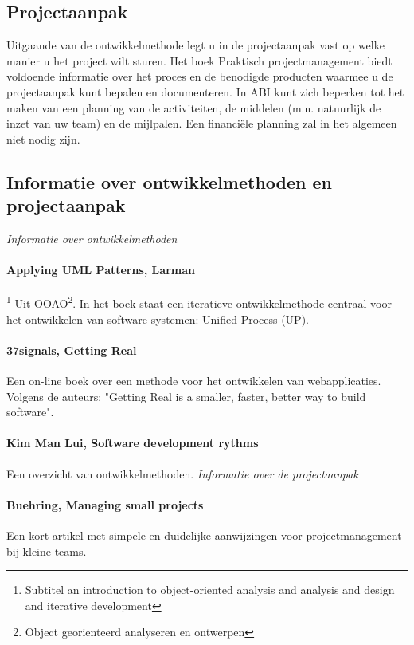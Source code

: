\subsection{Projectaanpak}
    Uitgaande van de ontwikkelmethode legt u in de projectaanpak vast op welke
manier u het project wilt sturen. Het boek Praktisch projectmanagement biedt
voldoende informatie over het proces en de benodigde producten waarmee u de
projectaanpak kunt bepalen en documenteren.
    In ABI kunt zich beperken tot het maken van een planning van de
activiteiten, de middelen (m.n. natuurlijk de inzet van uw team) en de
mijlpalen. Een financiële planning zal in het algemeen niet nodig zijn.

\subsection{Informatie over ontwikkelmethoden en projectaanpak}

\emph{Informatie over ontwikkelmethoden}

\paragraph{Applying UML Patterns, Larman}\footnote{Subtitel an introduction to object-oriented analysis
and analysis and design and iterative development} Uit OOAO\footnote{Object georienteerd
analyseren en ontwerpen}.  In het boek staat een
iteratieve ontwikkelmethode centraal voor het ontwikkelen van software
systemen: Unified Process (UP).
\paragraph{37signals, Getting Real} Een on-line boek over een methode
voor het ontwikkelen van webapplicaties. Volgens de auteurs: "Getting
Real is a smaller, faster, better way to build software".
\paragraph{Kim Man Lui, Software development rythms} Een overzicht van
ontwikkelmethoden.
\vfil
\emph{Informatie over de projectaanpak}

\paragraph{Buehring, Managing small projects}
Een kort artikel met simpele en duidelijke aanwijzingen voor projectmanagement bij kleine teams.

